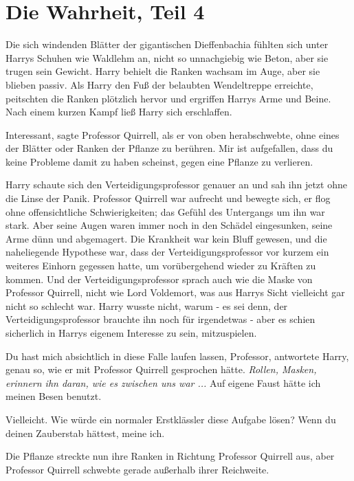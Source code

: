 \chapter{Die Wahrheit, Teil 4}

Die sich windenden Blätter der gigantischen Dieffenbachia fühlten sich unter
Harrys Schuhen wie Waldlehm an, nicht so unnachgiebig wie Beton, aber sie trugen
sein Gewicht. Harry behielt die Ranken wachsam im Auge, aber sie blieben passiv.
Als Harry den Fuß der belaubten Wendeltreppe erreichte, peitschten die Ranken
plötzlich hervor und ergriffen Harrys Arme und Beine. Nach einem kurzen Kampf
ließ Harry sich erschlaffen.

\glqq{}Interessant\grqq{}, sagte Professor Quirrell, als er von oben
herabschwebte, ohne eines der Blätter oder Ranken der Pflanze zu berühren. \glqq{}
Mir ist aufgefallen, dass du keine Probleme damit zu haben scheinst, gegen eine
Pflanze zu verlieren.\grqq{}

Harry schaute sich den Verteidigungsprofessor genauer an und sah ihn jetzt ohne
die Linse der Panik. Professor Quirrell war aufrecht und bewegte sich, er flog
ohne offensichtliche Schwierigkeiten; das Gefühl des Untergangs um ihn war
stark. Aber seine Augen waren immer noch in den Schädel eingesunken, seine Arme
dünn und abgemagert. Die Krankheit war kein Bluff gewesen, und die naheliegende
Hypothese war, dass der Verteidigungsprofessor vor kurzem ein weiteres Einhorn
gegessen hatte, um vorübergehend wieder zu Kräften zu kommen. Und der
Verteidigungsprofessor sprach auch wie die Maske von Professor Quirrell, nicht
wie Lord Voldemort, was aus Harrys Sicht vielleicht gar nicht so schlecht war.
Harry wusste nicht, warum - es sei denn, der Verteidigungsprofessor brauchte ihn
noch für irgendetwas - aber es schien sicherlich in Harrys eigenem Interesse zu
sein, mitzuspielen.

\glqq{}Du hast mich absichtlich in diese Falle laufen lassen, Professor\grqq{},
antwortete Harry, genau so, wie er mit Professor Quirrell gesprochen hätte.
\emph{Rollen, Masken, erinnern ihn daran, wie es zwischen uns war ...}
\glqq{}Auf eigene Faust hätte ich meinen Besen benutzt.\grqq{}

\glqq{}Vielleicht. Wie würde ein normaler Erstklässler diese Aufgabe lösen? Wenn
du deinen Zauberstab hättest, meine ich.\grqq{}

Die Pflanze streckte nun ihre Ranken in Richtung Professor Quirrell aus, aber
Professor Quirrell schwebte gerade außerhalb ihrer Reichweite.

